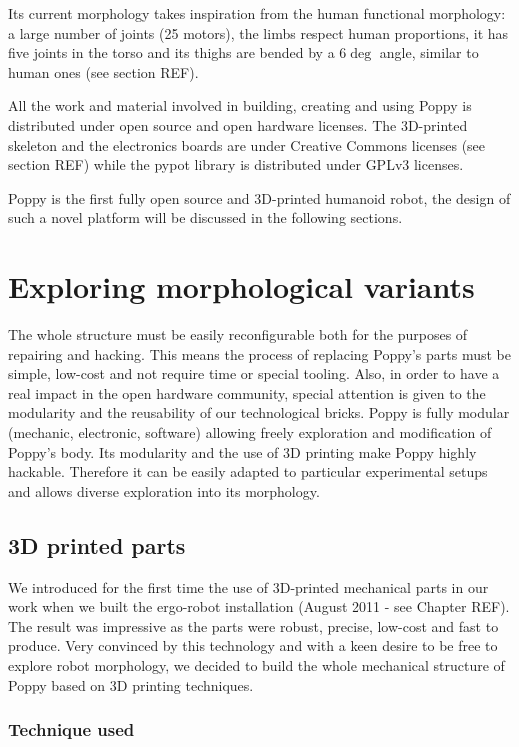 Its current morphology takes inspiration from the human functional morphology: a large number of joints (25 motors), the limbs respect human proportions, it has five joints in the torso and its thighs are bended by a $6\deg$ angle, similar to human ones (see section REF).

All the work and material involved in building, creating and using Poppy is distributed under open source and open hardware licenses. The 3D-printed skeleton and the electronics boards are under Creative Commons licenses (see section REF) while the pypot library is distributed under GPLv3 licenses.

Poppy is the first fully open source and 3D-printed humanoid robot, the design of such a novel platform will be discussed in the following sections.



\section{Exploring morphological variants} %

The whole structure must be easily reconfigurable both for the purposes of repairing and hacking. This means the process of replacing Poppy's parts must be simple, low-cost and not require time or special tooling. Also, in order to have a real impact in the open hardware community, special attention is given to the modularity and the reusability of our technological bricks.
Poppy is fully modular (mechanic, electronic, software) allowing freely exploration and modification of Poppy's body.
Its modularity and the use of 3D printing make Poppy highly hackable. Therefore it can be easily adapted to particular experimental setups and allows diverse exploration into its morphology.


\subsection{3D printed parts} %

We introduced for the first time the use of 3D-printed mechanical parts in our work when we built the ergo-robot installation (August 2011 - see Chapter REF). The result was impressive as the parts were robust, precise, low-cost and fast to produce. Very convinced by this technology and with a keen desire to be free to explore robot morphology, we decided to build the whole mechanical structure of Poppy based on 3D printing techniques.

\subsubsection{Technique used} %

